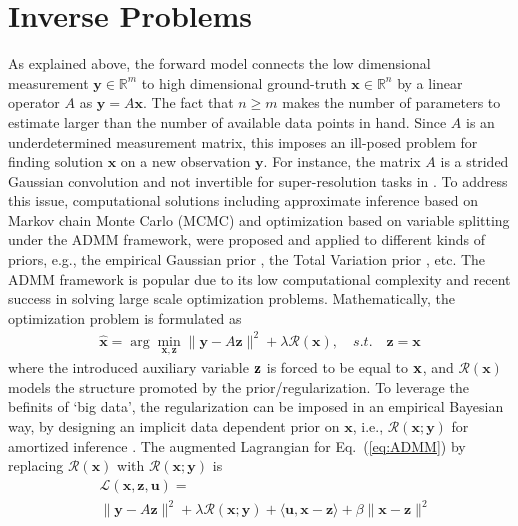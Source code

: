 \documentclass[10pt,twocolumn,letterpaper]{article}
\begin{document}
\section{Inverse Problems}
As explained above, the forward model connects the low dimensional measurement $\mathbf{y}\in\mathbb{R}^{m}$ to high dimensional ground-truth $\mathbf{x}\in \mathbb{R}^{n}$ by a linear operator $A$ as $\mathbf{y} = A\mathbf{x}$. The fact that $n \geq m$ makes the number of parameters to estimate larger than the number of available data points in hand. %
Since $A$ is an underdetermined measurement matrix, this imposes an ill-posed problem for finding solution $\mathbf{x}$ on a new 
observation $\mathbf{y}$. For instance, the matrix $A$ is a strided Gaussian convolution and not invertible for super-resolution tasks in \cite{shi2016real, sonderby2016amortised}. To address this issue, computational solutions including approximate inference based on Markov chain Monte Carlo (MCMC) and optimization based on variable splitting under the ADMM framework, were proposed and applied to different kinds of priors, e.g., the empirical Gaussian prior \cite{Wei2015JSTSP,Zhao2016}, the Total Variation prior \cite{Simoes2015}, etc. The ADMM framework is popular due to its low computational 
complexity and recent success in solving large scale optimization problems. 
Mathematically, the optimization problem is formulated as %
%
\begin{align}\label{eq:ADMM}
\hat{\mathbf{x}} = \arg\min_{\mathbf{x}, \mathbf{z}} \|\mathbf{y} - A\mathbf{z}\|^2 + \lambda\mathcal{R}(\mathbf{x}), \quad s.t. \quad \mathbf{z} = \mathbf{x}
\end{align}
where the introduced auxiliary variable ${\mathbf{z}}$ is forced to be equal to ${\mathbf{x}}$, and $\mathcal{R}(\mathbf{x})$ models the structure promoted by the prior/regularization. To leverage the befinits of `big data', the regularization can be imposed in an empirical Bayesian way, by designing an implicit data dependent prior on $\mathbf{x}$, i.e., $\mathcal{R}(\mathbf{x}; \mathbf{y})$ for amortized inference \cite{sonderby2016amortised}. The augmented Lagrangian for Eq.~(\ref{eq:ADMM}) by replacing $\mathcal{R}(\mathbf{x})$ with 
$\mathcal{R}(\mathbf{x}; \mathbf{y})$ is
\begin{equation}
\begin{split}
&\mathcal{L}(\mathbf{x}, \mathbf{z}, \mathbf{u}) = \\
 &\|\mathbf{y} - A\mathbf{z}\|^2 + \lambda\mathcal{R}(\mathbf{x}; \mathbf{y}) + \langle \mathbf{u}, \mathbf{x} - \mathbf{z} \rangle + \beta \|\mathbf{x} - \mathbf{z}\|^2
\end{split}
\end{equation}
\end{document}
